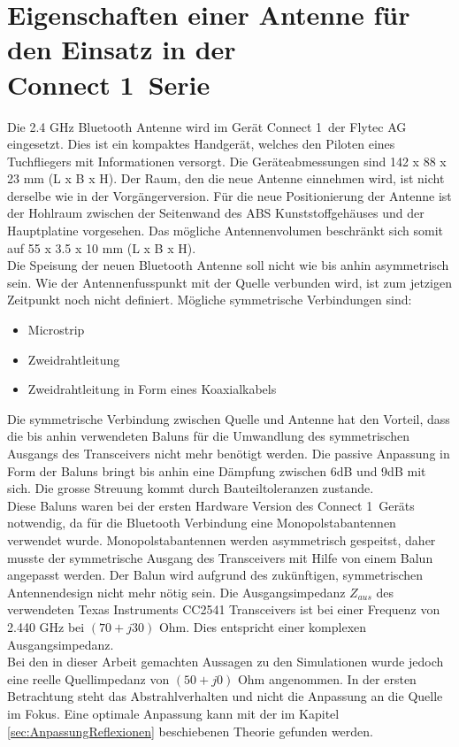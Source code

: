 \section{Eigenschaften einer Antenne für den Einsatz in der \\ \glqq Connect 1\grqq \  Serie}\label{sec:EigenschaftenAntenne}
Die 2.4 GHz Bluetooth Antenne wird im Gerät \glqq Connect 1\grqq \  der Flytec AG eingesetzt. Dies ist ein kompaktes Handgerät, welches den Piloten eines Tuchfliegers mit Informationen versorgt. Die Geräteabmessungen sind 142 x 88 x 23 mm (L x B x H). Der Raum, den die neue Antenne einnehmen wird, ist nicht derselbe wie in der Vorgängerversion. Für die neue Positionierung der Antenne ist der Hohlraum zwischen der Seitenwand des ABS Kunststoffgehäuses und der Hauptplatine  vorgesehen. Das mögliche Antennenvolumen beschränkt sich somit auf 55 x 3.5 x 10 mm (L x B x H).\\
Die Speisung der neuen Bluetooth Antenne soll nicht wie bis anhin asymmetrisch sein. Wie der Antennenfusspunkt mit der Quelle verbunden wird, ist zum jetzigen Zeitpunkt noch nicht definiert. Mögliche symmetrische Verbindungen sind:
\begin{itemize}
\item Microstrip   
\item Zweidrahtleitung
\item Zweidrahtleitung in Form eines Koaxialkabels
\end{itemize}
Die symmetrische Verbindung zwischen Quelle und Antenne hat den Vorteil, dass die bis anhin verwendeten Baluns für die Umwandlung des symmetrischen Ausgangs des Transceivers nicht mehr benötigt werden. Die passive Anpassung in Form der Baluns bringt bis anhin eine Dämpfung zwischen 6dB und 9dB mit sich. Die grosse Streuung kommt durch Bauteiltoleranzen zustande.\\
Diese Baluns waren bei der ersten Hardware Version des \glqq Connect 1\grqq \ Geräts notwendig, da für die Bluetooth Verbindung eine Monopolstabantennen verwendet wurde. Monopolstabantennen werden asymmetrisch gespeitst, daher musste der symmetrische Ausgang des Transceivers mit Hilfe von einem Balun angepasst werden. Der Balun wird aufgrund des zukünftigen, symmetrischen Antennendesign nicht mehr nötig sein. Die Ausgangsimpedanz $Z_{aus}$ des verwendeten Texas Instruments CC2541 Transceivers ist bei einer Frequenz von 2.440 GHz bei $(70+j30)$ Ohm. Dies entspricht einer komplexen Ausgangsimpedanz. \\
Bei den in dieser Arbeit gemachten Aussagen zu den Simulationen wurde jedoch eine reelle Quellimpedanz von $(50+j0)$ Ohm angenommen. In der ersten Betrachtung steht das Abstrahlverhalten und nicht die Anpassung an die Quelle im Fokus. Eine optimale Anpassung kann mit der im Kapitel \ref{sec:AnpassungReflexionen} beschiebenen Theorie gefunden werden.\\
